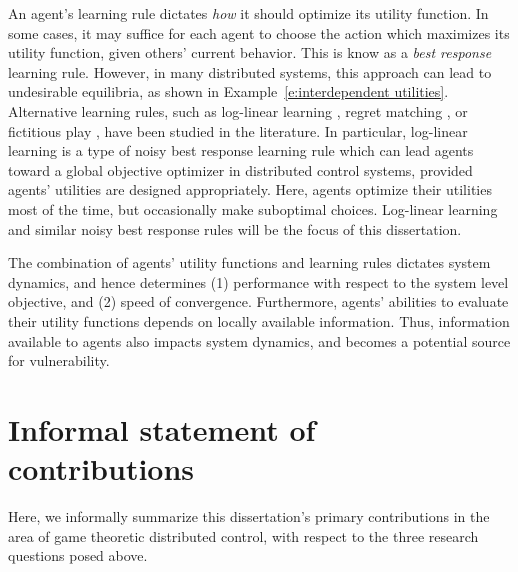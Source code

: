 An agent's learning rule dictates {\it how} it should optimize its utility function. In some cases, it may suffice for each agent to choose the action which maximizes its utility function, given others' current behavior. This is know as a {\it best response} learning rule. However, in many distributed systems, this approach can lead to undesirable equilibria, as shown in Example~\ref{e:interdependent utilities}. Alternative learning rules, such as log-linear learning \cite{Blume1993}, regret matching \cite{Foster2006, Marden2007}, or fictitious play \cite{fp1,fp2}, have been studied in the literature. In particular, log-linear learning is a type of noisy best response learning rule which can lead agents toward a global objective optimizer in distributed control systems, provided agents' utilities are designed appropriately. Here, agents optimize their utilities most of the time, but occasionally make suboptimal choices. Log-linear learning and similar noisy best response rules will be the focus of this dissertation.

The combination of agents' utility functions and learning rules dictates system dynamics, and hence determines (1) performance with respect to the system level objective, and (2) speed of convergence. Furthermore, agents' abilities to evaluate their utility functions depends on locally available information. Thus, information available to agents also impacts system dynamics, and becomes a potential source for vulnerability.



\section{Informal statement of contributions}


Here, we informally summarize this dissertation's primary contributions in the area of game theoretic distributed control, with respect to the three research questions posed above.


